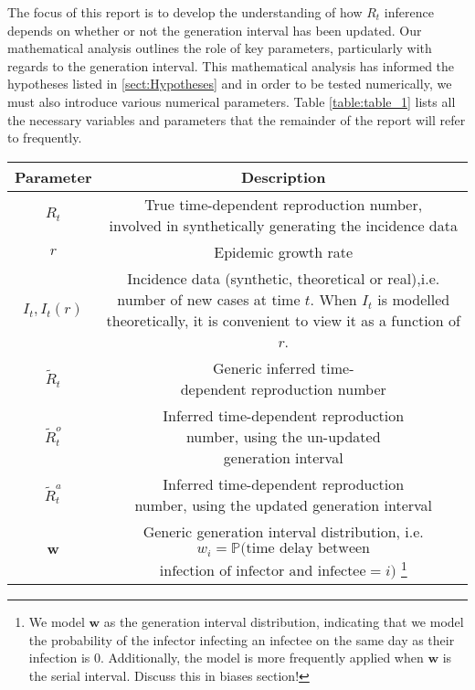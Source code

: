 \documentclass[10pt,journal,compsoc]{IEEEtran}
\begin{document}
The focus of this report is to develop the understanding of how $R_t$ inference depends on whether or not the generation interval has been updated. Our mathematical analysis outlines the role of key parameters, particularly with regards to the generation interval. This mathematical analysis has informed the hypotheses listed in \ref{sect:Hypotheses} and in order to be tested numerically, we must also introduce various numerical parameters. Table \ref{table:table_1} lists all the necessary variables and parameters that the remainder of the report will refer to frequently.

\begin{table}[htbp]
\centering
\begin{tabular}{|c||c|} \hline\hline
Parameter & Description \\ \hline
$R_t$ & \makecell{True time-dependent reproduction number, \\ involved in synthetically generating the incidence data} \\ \hline

$r$ & Epidemic growth rate \\ \hline

$I_t, I_t(r)$ & \makecell{Incidence data (synthetic, theoretical or \\ real),i.e. number of new cases at time $t$. \\ When $I_t$ is modelled theoretically, it is \\ convenient to view it as a function of $r$}.\\ \hline

$\tilde{R}_t$ & \makecell{Generic inferred time- \\ dependent reproduction number} \\ \hline

$\tilde{R}_t^o$ & \makecell{Inferred time-dependent reproduction \\ number, using the un-updated \\ generation interval } \\ \hline

$\tilde{R}_t^a$ & \makecell{Inferred time-dependent reproduction \\ number, using the updated generation interval } \\ \hline

$\boldsymbol{w}$ & \makecell{Generic generation interval distribution,\\ i.e. $w_i = \mathbb{P}(\text{time delay between}$ \\ $\text{infection of infector and infectee}=i)$ \footnote{We model $\boldsymbol{w}$ as the generation interval distribution, indicating that we model the probability of the infector infecting an infectee on the same day as their infection is 0. Additionally, the model is more frequently applied when $\boldsymbol{w}$ is the serial interval. Discuss this in biases section!}} \\ \hline


\end{tabular}
\end{table}
\end{document}
